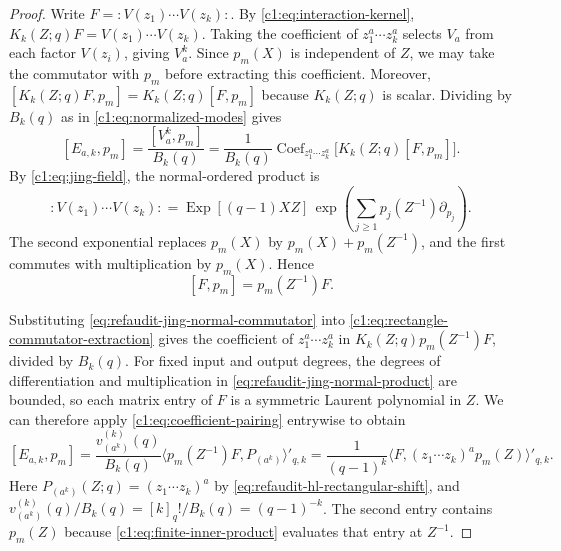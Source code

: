 \documentclass[12pt,reqno,a4paper]{amsart}
\numberwithin{equation}{section}
\numberwithin{figure}{section}
\theoremstyle{plain}
\theoremstyle{definition}
\DeclareMathOperator{\Coef}{Coef}
\begin{document}
\begin{proof}
Write $F=:V(z_1)\cdots V(z_k):$.  By \eqref{c1:eq:interaction-kernel},
$K_k(Z;q)F=V(z_1)\cdots V(z_k)$.  Taking the coefficient of
$z_1^a\cdots z_k^a$ selects $V_a$ from each factor $V(z_i)$, giving
$V_a^k$.  Since $p_m(X)$ is independent of $Z$, we may take the
commutator with $p_m$ before extracting this coefficient.  Moreover,
$[K_k(Z;q)F,p_m]=K_k(Z;q)[F,p_m]$ because $K_k(Z;q)$ is scalar.
Dividing by $B_k(q)$ as in \eqref{c1:eq:normalized-modes} gives
\begin{equation}\label{c1:eq:rectangle-commutator-extraction}
 [E_{a,k},p_m]
 =\frac{[V_a^k,p_m]}{B_k(q)}
 =\frac{1}{B_k(q)}\Coef_{z_1^a\cdots z_k^a}
      \bigl[K_k(Z;q)[F,p_m]\bigr].
\end{equation}
By \eqref{c1:eq:jing-field}, the normal-ordered product is
\begin{equation}\label{eq:refaudit-jing-normal-product}
 :V(z_1)\cdots V(z_k):
 =\operatorname{Exp}[(q-1)XZ]\,
   \exp\left(\sum_{j\geq1}p_j(Z^{-1})\partial_{p_j}\right).
\end{equation}
The second exponential replaces $p_m(X)$ by $p_m(X)+p_m(Z^{-1})$,
and the first commutes with multiplication by $p_m(X)$.  Hence
\begin{equation}\label{eq:refaudit-jing-normal-commutator}
 [F,p_m]=p_m(Z^{-1})F.
\end{equation}

Substituting \eqref{eq:refaudit-jing-normal-commutator} into
\eqref{c1:eq:rectangle-commutator-extraction} gives the coefficient of
$z_1^a\cdots z_k^a$ in $K_k(Z;q)p_m(Z^{-1})F$, divided by $B_k(q)$.
For fixed input and output degrees, the degrees of differentiation and
multiplication in \eqref{eq:refaudit-jing-normal-product} are bounded,
so each matrix entry of $F$ is a symmetric Laurent polynomial in $Z$.
We can therefore apply \eqref{c1:eq:coefficient-pairing} entrywise to obtain
\[
 [E_{a,k},p_m]
 =\frac{v_{(a^k)}^{(k)}(q)}{B_k(q)}
   \bigl\langle p_m(Z^{-1})F,P_{(a^k)}\bigr\rangle'_{q,k}
 =\frac{1}{(q-1)^k}
   \bigl\langle F,(z_1\cdots z_k)^a p_m(Z)\bigr\rangle'_{q,k}.
\]
Here $P_{(a^k)}(Z;q)=(z_1\cdots z_k)^a$ by
\eqref{eq:refaudit-hl-rectangular-shift}, and
$v_{(a^k)}^{(k)}(q)/B_k(q)=[k]_q!/B_k(q)=(q-1)^{-k}$.
The second entry contains $p_m(Z)$ because
\eqref{c1:eq:finite-inner-product} evaluates that entry at $Z^{-1}$.


\end{proof}
\end{document}
